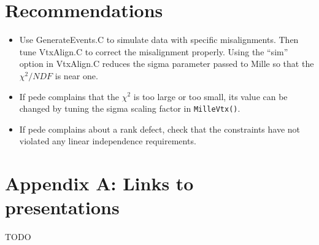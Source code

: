 \documentclass[12pt]{article}
\begin{document}
\section{Recommendations}
\begin{itemize}
  \item Use GenerateEvents.C to simulate data with specific misalignments. Then tune VtxAlign.C to correct the misalignment properly. Using the ``sim'' option in VtxAlign.C reduces the sigma parameter passed to Mille so that the $\chi^2/NDF$ is near one.
  \item If pede complains that the $\chi^2$ is too large or too small, its value can be changed by tuning the sigma scaling factor in \texttt{MilleVtx()}.
  \item If pede complains about a rank defect, check that the constraints have not violated any linear independence requirements. 
\end{itemize}
\section{Appendix A: Links to presentations}
TODO
\end{document}
